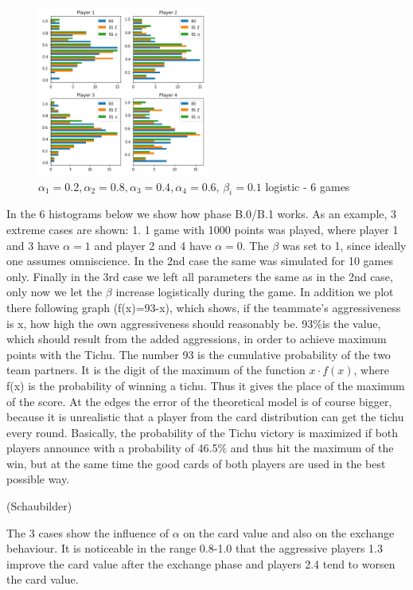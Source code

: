 \begin{figure}[!ht]
    \centering
    \includegraphics[width=0.5\textwidth]{Bilder/example_2}
    \caption{$\alpha_1=0.2,\alpha_2=0.8,\alpha_3=0.4,\alpha_4=0.6$, $\beta_i=0.1$ logistic - 6 games}
    \label{fig:meine-grafik}
\end{figure}


In the 6 histograms below we show how phase B.0/B.1 works. As an example, 3 extreme cases are shown: 1. 1 game with 1000 points was played, where player 1 and 3 have $\alpha = 1$ and player 2 and 4 have $\alpha=0$. The $\beta$ was set to 1, since ideally one assumes omniscience. In the 2nd case the same was simulated for 10 games only. Finally in the 3rd case we left all parameters the same as in the 2nd case, only now we let the $\beta$ increase logistically during the game. In addition we plot there following graph (f(x)=93-x), which shows, if the teammate's aggressiveness is x, how high the own aggressiveness should reasonably be.
93$\%$is the value, which should result from the added aggressions, in order to achieve maximum points with the Tichu. The number 93 is the cumulative probability of the two team partners. It is the digit of the maximum of the function $x\cdot f(x)$, where f(x) is the probability of winning a tichu. Thus it gives the place of the maximum of the score.
At the edges the error of the theoretical model is of course bigger, because it is unrealistic that a player from the card distribution can get the tichu every round. 
Basically, the probability of the Tichu victory is maximized if both players announce with a probability of 46.5$\%$ and thus hit the maximum of the win, but at the same time the good cards of both players are used in the best possible way.

(Schaubilder)

The 3 cases show the influence of $\alpha$ on the card value and also on the exchange behaviour. It is noticeable in the range 0.8-1.0 that the aggressive players 1.3 improve the card value after the exchange phase and players 2.4 tend to worsen the card value.

